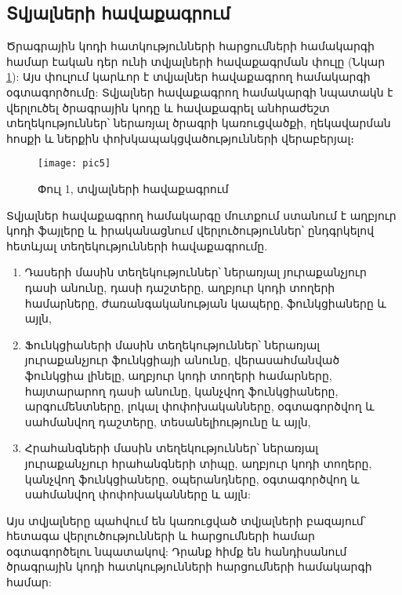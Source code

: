 {
    \subsection{Տվյալների հավաքագրում}\label{subsec:dataCollection}
    Ծրագրային կոդի հատկությունների հարցումների համակարգի համար էական դեր ունի տվյալների հավաքագրման փուլը
    (Նկար \ref{fig:figure5}): Այս փուլում  կարևոր է տվյալներ հավաքագրող համակարգի
    օգտագործումը: Տվյալներ հավաքագրող համակարգի նպատակն է վերլուծել ծրագրային կոդը և հավաքագրել անհրաժեշտ
    տեղեկություններ՝ ներառյալ ծրագրի կառուցվածքի, ղեկավարման հոսքի և ներքին փոխկապակցվածությունների վերաբերյալ։

    \begin{figure}[h]
        \centering
        \texttt{[image: pic5]}
        \caption{Փուլ 1, տվյալների հավաքագրում}
        \label{fig:figure5}
    \end{figure}

    Տվյալներ հավաքագրող համակարգը մուտքում ստանում է աղբյուր կոդի ֆայլերը և իրականացնում վերլուծություններ՝
    ընդգրկելով հետևյալ տեղեկությունների հավաքագրումը.
    \begin{enumerate}
        \item Դասերի մասին տեղեկություններ՝ ներառյալ յուրաքանչյուր դասի անունը, դասի դաշտերը,
        աղբյուր կոդի տողերի համարները, ժառանգականության կապերը, ֆունկցիաները և այլն,
        \item Ֆունկցիաների մասին տեղեկություններ՝ ներառյալ յուրաքանչյուր ֆունկցիայի անունը, վերասահմանված ֆունկցիա լինելը,
        աղբյուր կոդի տողերի համարները, հայտարարող դասի անունը, կանչվող ֆունկցիաները, արգումենտները, լոկալ փոփոխականները,
        օգտագործվող և սահմանվող դաշտերը, տեսանելիությունը և այլն,
        \item Հրահանգների մասին տեղեկություններ՝ ներառյալ յուրաքանչյուր հրահանգների տիպը, աղբյուր կոդի տողերը,
        կանչվող ֆունկցիաները, օպերանդները, օգտագործվող և սահմանվող փոփոխականները և այլն:
    \end{enumerate}

    Այս տվյալները պահվում են կառուցված տվյալների բազայում՝ հետագա վերլուծությունների և հարցումների համար
    օգտագործելու նպատակով: Դրանք հիմք են հանդիսանում ծրագրային կոդի հատկությունների հարցումների համակարգի համար:

    

%    
}